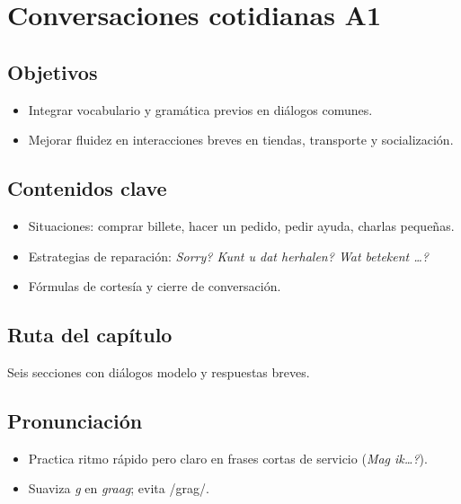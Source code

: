 \chapter{Conversaciones cotidianas A1}
\section{Objetivos}
\begin{itemize}[leftmargin=*]
	\item Integrar vocabulario y gramática previos en diálogos comunes.
	\item Mejorar fluidez en interacciones breves en tiendas, transporte y socialización.
\end{itemize}

\section{Contenidos clave}
\begin{itemize}[leftmargin=*]
	\item Situaciones: comprar billete, hacer un pedido, pedir ayuda, charlas pequeñas.
	\item Estrategias de reparación: \textit{Sorry? Kunt u dat herhalen? Wat betekent \ldots{}?}
	\item Fórmulas de cortesía y cierre de conversación.
\end{itemize}

\section{Ruta del capítulo}
Seis secciones con diálogos modelo y respuestas breves.








\section{Pronunciación}
\begin{itemize}[leftmargin=*]
	\item Practica ritmo rápido pero claro en frases cortas de servicio (\textit{Mag ik\ldots?}).
	\item Suaviza \textit{g} en \textit{graag}; evita /grag/.
\end{itemize}

